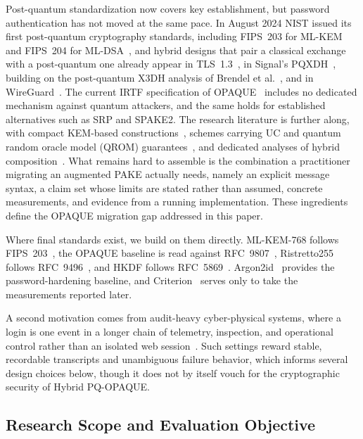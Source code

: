 \documentclass{ieeeijc}
\theoremstyle{remark}
\begin{document}
Post-quantum standardization now covers key establishment, but password
authentication has not moved at the same pace. In August 2024 NIST issued its
first post-quantum cryptography standards, including FIPS~203 for ML-KEM and FIPS~204 for
ML-DSA~\cite{fips203,fips204}, and hybrid designs that pair a classical
exchange with a post-quantum one already appear in TLS~1.3~\cite{stebila2024},
in Signal's PQXDH~\cite{kret2023pqxdh}, building on the post-quantum X3DH
analysis of Brendel et al.~\cite{brendel2020}, and in
WireGuard~\cite{hulsing2021}. The current IRTF specification of
OPAQUE~\cite{ietf-opaque} includes no dedicated mechanism against quantum
attackers, and the same holds for established alternatives such as SRP and
SPAKE2. The research literature is further along, with compact KEM-based
constructions~\cite{arriaga2024}, schemes carrying UC and quantum random
oracle model (QROM) guarantees~\cite{lyu2024uc}, and dedicated analyses of
hybrid composition~\cite{hesse2024,lyu2024hybrid}. What remains hard to
assemble is the combination a practitioner migrating an augmented PAKE actually
needs, namely an explicit message syntax, a claim set whose limits are stated
rather than assumed, concrete measurements, and evidence from a running
implementation. These ingredients define the OPAQUE migration gap addressed in
this paper.

Where final standards exist, we build on them directly. ML-KEM-768 follows
FIPS~203~\cite{fips203}, the OPAQUE baseline is read against
RFC~9807~\cite{ietf-opaque}, Ristretto255 follows RFC~9496~\cite{devalence2024},
and HKDF follows RFC~5869~\cite{krawczyk2010}. Argon2id~\cite{biryukov2016}
provides the password-hardening baseline, and Criterion~\cite{heisler2023}
serves only to take the measurements reported later.

A second motivation comes from audit-heavy cyber-physical systems, where a login
is one event in a longer chain of telemetry, inspection, and operational control
rather than an isolated web session~\cite{svystun2025dytam,svystun2024thermal,lysyi2025fire}.
Such settings reward stable, recordable transcripts and unambiguous failure
behavior, which informs several design choices below, though it does not by
itself vouch for the cryptographic security of Hybrid PQ-OPAQUE.

\subsection{Research Scope and Evaluation Objective}
\end{document}
